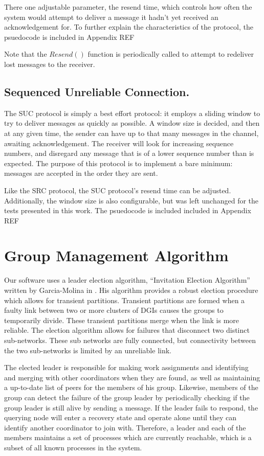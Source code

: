 There one adjustable parameter, the resend time, which controls how often the 
system would attempt to deliver a message it hadn't yet received an 
acknowledgement for. To further explain the characteristics of the protocol, 
the psuedocode is included in Appendix REF

Note that the $Resend()$ function is periodically called to attempt to redeliver
lost messages to the receiver. 

\subsection{Sequenced Unreliable Connection.}

The SUC protocol is simply a best effort protocol: it employs a sliding window 
to try to deliver messages as quickly as possible. A window size is decided, 
and then at any given time, the sender can have up to that many messages in the 
channel, awaiting acknowledgement. The receiver will look for increasing 
sequence numbers, and disregard any message that is of a lower sequence number 
than is expected. The purpose of this protocol is to implement a bare minimum: 
messages are accepted in the order they are sent.

Like the SRC protocol, the SUC protocol's resend time can be adjusted. 
Additionally, the window size is also configurable, but was left unchanged for 
the tests presented in this work. The psuedocode is included included in Appendix REF

\section{Group Management Algorithm}

Our software uses a leader election algorithm, ``Invitation Election 
Algorithm'' written by Garcia-Molina in \cite{INVITATIONELECTION}. 
His algorithm provides a robust election procedure which allows for transient 
partitions. Transient partitions are formed when a faulty link between two or 
more clusters of DGIs causes the groups to temporarily divide. These transient 
partitions merge when the link is more reliable. The election algorithm 
allows for failures that disconnect two distinct sub-networks. These sub 
networks are fully connected, but connectivity between the two sub-networks is 
limited by an unreliable link.

The elected leader is responsible for making work assignments and identifying 
and merging with other coordinators when they are found, as well as maintaining 
a up-to-date list of peers for the members of his group.  Likewise, members of 
the group can detect the failure of the group leader by periodically checking 
if the group leader is still alive by sending a message. If the leader fails to 
respond, the querying node will enter a recovery state and operate alone until 
they can identify another coordinator to join with. Therefore, a leader and each
of the members maintains a set of processes which are currently reachable, which
is a subset of all known processes in the system.


